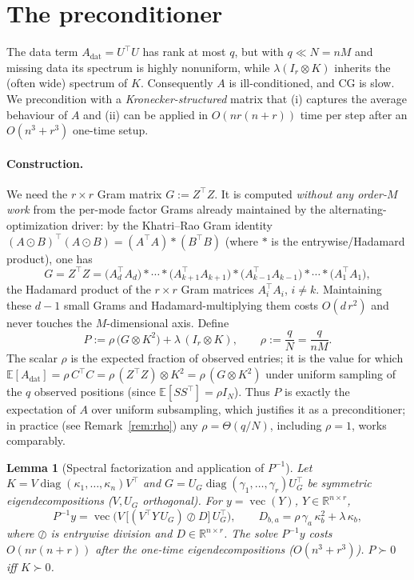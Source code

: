 \documentclass[12pt]{article}
\DeclareMathOperator{\vecop}{vec}
\DeclareMathOperator{\diag}{diag}
\newcommand{\bR}{\mathbb{R}}
\newtheorem{lemma}{Lemma}
\theoremstyle{remark}
\begin{document}
\section{The preconditioner}

The data term $A_{\mathrm{dat}}=U^{\!\top}U$ has rank at most $q$, but with $q\ll N=nM$ and missing data its spectrum is highly nonuniform, while $\lambda(I_r\otimes K)$ inherits the (often wide) spectrum of $K$. Consequently $A$ is ill-conditioned, and CG is slow. We precondition with a \emph{Kronecker-structured} matrix that (i) captures the average behaviour of $A$ and (ii) can be applied in $O(nr(n+r))$ time per step after an $O(n^3+r^3)$ one-time setup.

\paragraph{Construction.} We need the $r\times r$ Gram matrix $G:=Z^{\!\top}Z$. It is computed \emph{without any order-$M$ work} from the per-mode factor Grams already maintained by the alternating-optimization driver: by the Khatri--Rao Gram identity $(A\odot B)^{\!\top}(A\odot B)=(A^{\!\top}A)\ast(B^{\!\top}B)$ (where $\ast$ is the entrywise/Hadamard product), one has
\[
  G=Z^{\!\top}Z=\big(A_d^{\!\top}A_d\big)\ast\cdots\ast\big(A_{k+1}^{\!\top}A_{k+1}\big)\ast\big(A_{k-1}^{\!\top}A_{k-1}\big)\ast\cdots\ast\big(A_1^{\!\top}A_1\big),
\]
the Hadamard product of the $r\times r$ Gram matrices $A_i^{\!\top}A_i$, $i\neq k$. Maintaining these $d-1$ small Grams and Hadamard-multiplying them costs $O(d\,r^2)$ and never touches the $M$-dimensional axis. Define
\begin{equation}\label{eq:prec}
  P := \rho\,\big(G \otimes K^2\big) + \lambda\,(I_r\otimes K),
  \qquad \rho := \frac{q}{N}=\frac{q}{nM}.
\end{equation}
The scalar $\rho$ is the expected fraction of observed entries; it is the value for which $\mathbb{E}[A_{\mathrm{dat}}]=\rho\,C^{\!\top}C=\rho\,(Z^{\!\top}Z)\otimes K^2=\rho\,(G\otimes K^2)$ under uniform sampling of the $q$ observed positions (since $\mathbb{E}[SS^{\!\top}]=\rho I_N$). Thus $P$ is exactly the expectation of $A$ over uniform subsampling, which justifies it as a preconditioner; in practice (see Remark~\ref{rem:rho}) any $\rho=\Theta(q/N)$, including $\rho=1$, works comparably.

\begin{lemma}[Spectral factorization and application of $P^{-1}$]\label{lem:precapply}
Let $K=V\diag(\kappa_1,\dots,\kappa_n)V^{\!\top}$ and $G=U_G\diag(\gamma_1,\dots,\gamma_r)U_G^{\!\top}$ be symmetric eigendecompositions ($V,U_G$ orthogonal). For $y=\vecop(Y)$, $Y\in\bR^{n\times r}$,
\begin{equation}\label{eq:Pinv}
  P^{-1}y = \vecop\!\Big(V\,\big[(V^{\!\top}Y\,U_G)\oslash D\big]\,U_G^{\!\top}\Big),
  \qquad D_{b,a}=\rho\,\gamma_a\,\kappa_b^2+\lambda\,\kappa_b,
\end{equation}
where $\oslash$ is entrywise division and $D\in\bR^{n\times r}$. The solve $P^{-1}y$ costs $O(nr(n+r))$ after the one-time eigendecompositions ($O(n^3+r^3)$). $P\succ0$ iff $K\succ0$.
\end{lemma}
\end{document}
